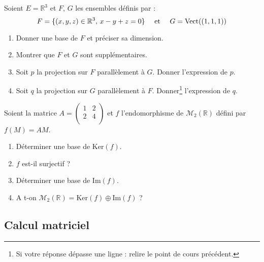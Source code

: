 \documentclass[a4paper,twoside,french,11pt]{VcCours}
\begin{document}
\begin{Exercice}{}
  Soient $E= \mathbb{R}^3$ et $F$, $G$ les ensembles définis par :
  $$ F = \lbrace (x,y,z) \in \mathbb{R}^3, \, x-y+z=0 \rbrace \quad \hbox{ et }  \quad G = \textrm{Vect}((1,1,1)) $$
  
  \begin{enumerate}
    \item Donner une base de $F$ et préciser sa dimension.
    \item Montrer que $F$ et $G$ sont supplémentaires.
    \item Soit $p$ la projection sur $F$ parallèlement à $G$. Donner l'expression de $p$.
    \item Soit $q$ la projection sur $G$ parallèlement à $F$. Donner\footnote{Si votre réponse dépasse une ligne : relire le point de cours précédent.} l'expression de $q$.
  \end{enumerate}
\end{Exercice} 
  

\begin{Exercice}{}
  Soient la matrice $A= \begin{pmatrix}
    1 & 2 \\
    2 & 4 \\
  \end{pmatrix}$ et $f$ l'endomorphisme de $\mathcal{M}_2(\mathbb{R})$ défini par $f(M)=AM$.
  
  \begin{enumerate}
    \item Déterminer une base de $\textrm{Ker}(f)$.
    \item $f$ est-il surjectif ?
    \item Déterminer une base de $\textrm{Im}(f)$.
    \item A t-on $\mathcal{M}_2(\mathbb{R}) = \textrm{Ker}(f) \oplus \textrm{Im}(f)$ ?
  \end{enumerate}
\end{Exercice} 
  
\subsection{Calcul matriciel}
\end{document}

